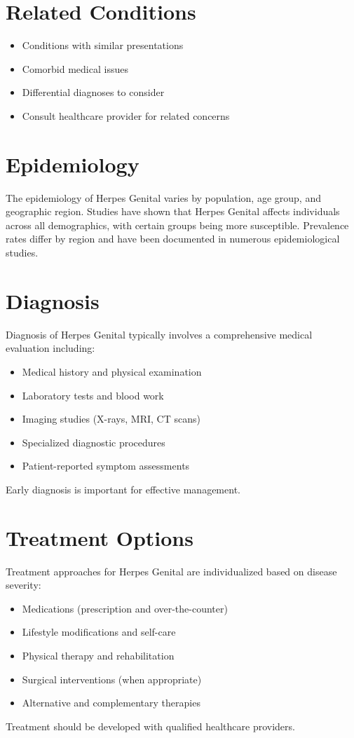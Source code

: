\section*{Related Conditions}
\begin{itemize}
  \item Conditions with similar presentations
  \item Comorbid medical issues
  \item Differential diagnoses to consider
  \item Consult healthcare provider for related concerns
\end{itemize}

\section*{Epidemiology}
The epidemiology of Herpes Genital varies by population, age group, and geographic region. Studies have shown that Herpes Genital affects individuals across all demographics, with certain groups being more susceptible. Prevalence rates differ by region and have been documented in numerous epidemiological studies.

\section*{Diagnosis}
Diagnosis of Herpes Genital typically involves a comprehensive medical evaluation including:
\begin{itemize}
  \item Medical history and physical examination
  \item Laboratory tests and blood work
  \item Imaging studies (X-rays, MRI, CT scans)
  \item Specialized diagnostic procedures
  \item Patient-reported symptom assessments
\end{itemize}
Early diagnosis is important for effective management.

\section*{Treatment Options}
Treatment approaches for Herpes Genital are individualized based on disease severity:
\begin{itemize}
  \item Medications (prescription and over-the-counter)
  \item Lifestyle modifications and self-care
  \item Physical therapy and rehabilitation
  \item Surgical interventions (when appropriate)
  \item Alternative and complementary therapies
\end{itemize}
Treatment should be developed with qualified healthcare providers.

